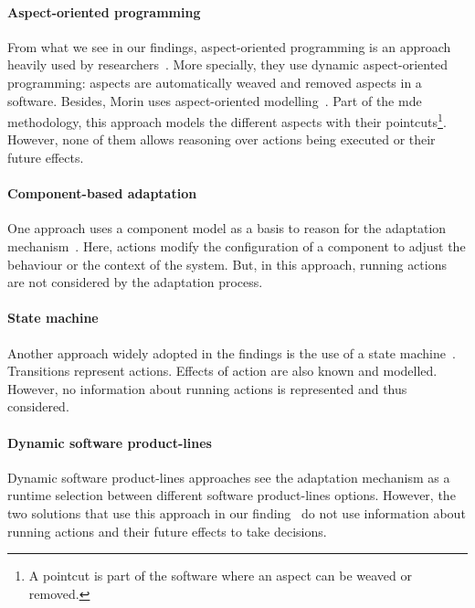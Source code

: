 \paragraph{Aspect-oriented programming}
From what we see in our findings, aspect-oriented programming is an approach heavily used by researchers~\cite{DBLP:journals/taosd/GreenwoodB06, DBLP:conf/soco/DavidL06, DBLP:conf/icws/CharfiDM09, DBLP:journals/scp/ParraBCD11, DBLP:conf/ewsa/FalcarinA04, DBLP:conf/gpce/PintoFT03}.
More specially, they use dynamic aspect-oriented programming: aspects are automatically weaved and removed aspects in a software.
Besides, Morin \etal uses aspect-oriented modelling~\cite{DBLP:conf/icse/MorinBNJ09}.
Part of the \gls{mde} methodology, this approach models the different aspects with their pointcuts\footnote{A pointcut is part of the software where an aspect can be weaved or removed.}.
However, none of them allows reasoning over \glspl{action} being executed or their future effects.
	
\paragraph{Component-based adaptation}
One approach uses a component model as a basis to reason for the adaptation mechanism~\cite{DBLP:conf/soco/DavidL06}.
Here, \glspl{action} modify the configuration of a component to adjust the behaviour or the context of the system.
But, in this approach, running \glspl{action} are not considered by the adaptation process.

\paragraph{State machine}
Another approach widely adopted in the findings is the use of a state machine~\cite{DBLP:conf/sigsoft/MorenoCGS15, DBLP:conf/kbse/FilieriGLM11,DBLP:conf/wetice/DjoudiBZ14, DBLP:conf/aosd/ZhangGC09, DBLP:conf/icse/GhezziPST13, DBLP:conf/kbse/TajalliGEM10}.
Transitions represent \glspl{action}.
Effects of action are also known and modelled.
However, no information about running \glspl{action} is represented and thus considered.

\paragraph{Dynamic software product-lines}
Dynamic software product-lines approaches see the adaptation mechanism as a runtime selection between different software product-lines options.
However, the two solutions that use this approach in our finding~\cite{DBLP:conf/dagstuhl/GhezziS10, DBLP:series/lncs/CordyCHLS13} do not use information about running \glspl{action} and their future effects to take decisions.  

